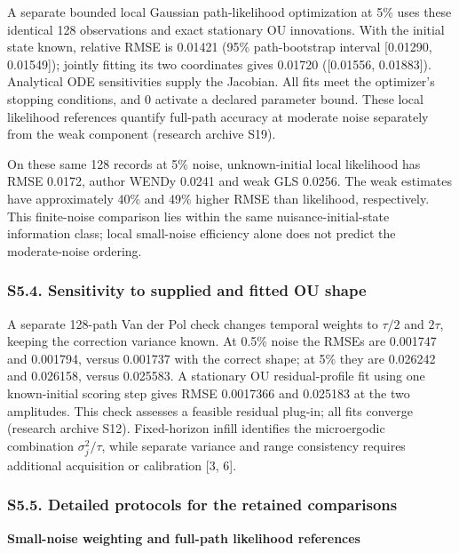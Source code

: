 \documentclass[
  american,
  11pt,
]{article}
\begin{document}
A separate bounded local Gaussian path-likelihood optimization at 5\%
uses these identical 128 observations and exact stationary OU
innovations. With the initial state known, relative RMSE is 0.01421
(95\% path-bootstrap interval {[}0.01290, 0.01549{]}); jointly fitting
its two coordinates gives 0.01720 ({[}0.01556, 0.01883{]}). Analytical
ODE sensitivities supply the Jacobian. All fits meet the optimizer's
stopping conditions, and 0 activate a declared parameter bound. These
local likelihood references quantify full-path accuracy at moderate
noise separately from the weak component (research archive S19).

On these same 128 records at 5\% noise, unknown-initial local likelihood
has RMSE 0.0172, author WENDy 0.0241 and weak GLS 0.0256. The weak
estimates have approximately 40\% and 49\% higher RMSE than likelihood,
respectively. This finite-noise comparison lies within the same
nuisance-initial-state information class; local small-noise efficiency
alone does not predict the moderate-noise ordering.

\subsubsection{S5.4. Sensitivity to supplied and fitted OU
shape}\label{s5.4.-sensitivity-to-supplied-and-fitted-ou-shape}

A separate 128-path Van der Pol check changes temporal weights to
\(\tau/2\) and \(2\tau\), keeping the correction variance known. At
0.5\% noise the RMSEs are 0.001747 and 0.001794, versus 0.001737 with
the correct shape; at 5\% they are 0.026242 and 0.026158, versus
0.025583. A stationary OU residual-profile fit using one known-initial
scoring step gives RMSE 0.0017366 and 0.025183 at the two amplitudes.
This check assesses a feasible residual plug-in; all fits converge
(research archive S12). Fixed-horizon infill identifies the microergodic
combination \(\sigma_j^2/\tau\), while separate variance and range
consistency requires additional acquisition or calibration {[}3, 6{]}.

\subsubsection{S5.5. Detailed protocols for the retained
comparisons}\label{s5.5.-detailed-protocols-for-the-retained-comparisons}

\textbf{Small-noise weighting and full-path likelihood references}
\end{document}
